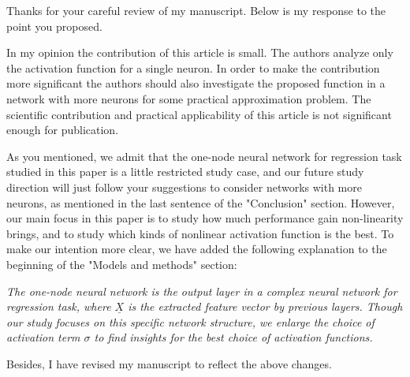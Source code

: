 \documentclass[answers]{exam}
\begin{document}
\pagestyle{empty}
Thanks for your careful review of my manuscript. Below is my response to the point you proposed.
\begin{questions}
\question
In my opinion the contribution of this article is small. The authors analyze only the activation function for a single neuron. In order to make the contribution more significant the authors should also investigate the proposed function in a network with more neurons for some practical approximation problem. The scientific contribution and practical applicability of this article is not significant enough for publication.
\begin{solution}
    As you mentioned, we admit that the one-node neural network for regression task studied in this paper is a little restricted study case,
    and our future study direction will just follow your suggestions to consider networks with more neurons, as mentioned in the last sentence of the "Conclusion" section.
    However, our main focus in this paper is to study how much performance gain  non-linearity brings, and to study which kinds of nonlinear activation function is the
    best. To make our intention more clear, we have added the following explanation to the beginning of the "Models and methods" section:

    \textit{
    The one-node neural network is the output layer in a complex neural network for regression task, where
    $\underline{X}$ is the extracted feature vector by previous layers.
    Though our study focuses on this specific network structure, we enlarge the choice of activation term $\sigma$ to find insights
    for the best choice of activation functions.
    }

\end{solution}
\end{questions}
Besides, I have revised my manuscript to reflect the above changes.
\end{document}
